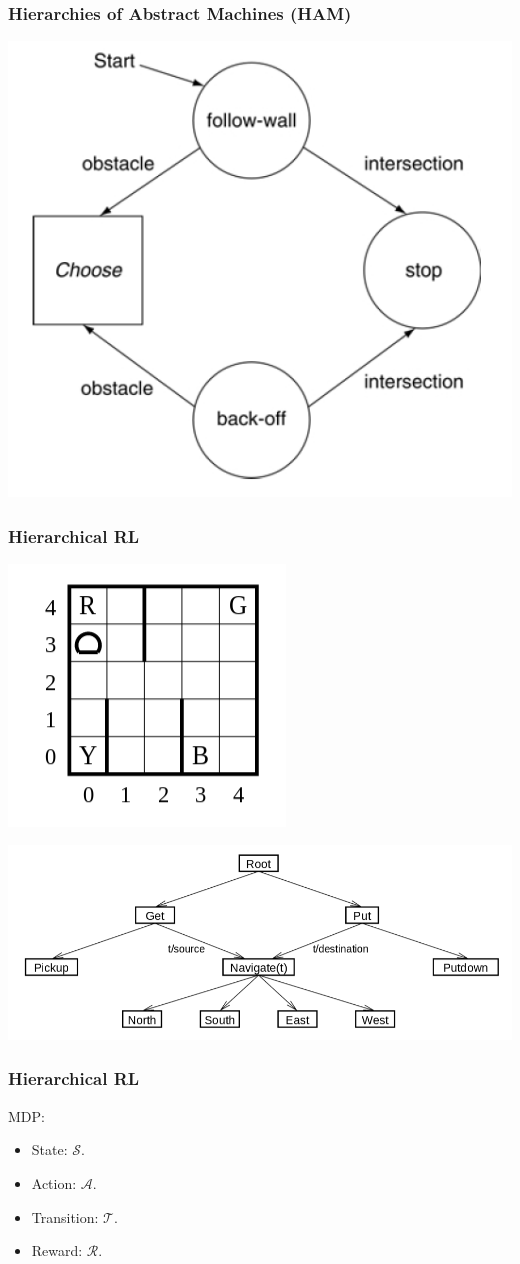 \documentclass{beamer}
\begin{document}
\begin{frame}
\frametitle{Hierarchies of Abstract Machines (HAM)}
\includegraphics[width=0.6\columnwidth]{ham.png}
\end{frame}

\begin{frame}
\frametitle{Hierarchical RL}
\includegraphics[width=0.4\columnwidth]{taxi.png}

\includegraphics[width=0.8\columnwidth]{maxq.png}
\end{frame}

\begin{frame}
\frametitle{Hierarchical RL}
MDP:
\begin{itemize}
  \item State: {\color{red}$\mathcal{S}$}.
  \item Action: {\color{red}$\mathcal{A}$}.
  \item Transition: {\color{red}$\mathcal{T}$}.
  \item Reward: {\color{red}$\mathcal{R}$}.
\end{itemize}
\end{frame}
\end{document}
